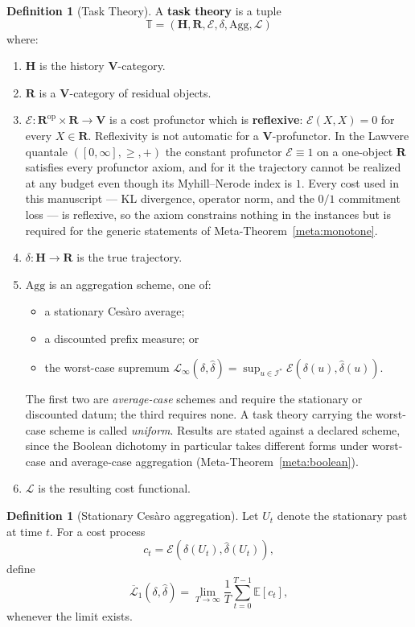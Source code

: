 \documentclass[12pt]{article}
\theoremstyle{definition}
\newtheorem{definition}[theorem]{Definition}
\begin{document}
\begin{definition}[Task Theory]
\label{def:task-theory}
A \textbf{task theory} is a tuple
\[
\mathbb T=(\mathbf H,\mathbf R,\mathcal E,\delta,\mathrm{Agg},\mathcal L)
\]
where:
\begin{enumerate}[nosep,label=(\arabic*)]
\item $\mathbf H$ is the history $\mathbf V$-category.
\item $\mathbf R$ is a $\mathbf V$-category of residual objects.
\item $\mathcal E:\mathbf R^{\mathrm{op}}\times\mathbf R\to\mathbf V$ is a
cost profunctor which is \textbf{reflexive}: $\mathcal E(X,X)=0$ for every
$X\in\mathbf R$.  Reflexivity is not automatic for a $\mathbf V$-profunctor.
In the Lawvere quantale $([0,\infty],\ge,+)$ the constant profunctor
$\mathcal E\equiv1$ on a one-object $\mathbf R$ satisfies every profunctor
axiom, and for it the trajectory cannot be realized at any budget even though
its Myhill--Nerode index is $1$.  Every cost used in this manuscript --- KL divergence,
operator norm, and the $0/1$ commitment loss --- is reflexive, so the axiom
constrains nothing in the instances but is required for the generic statements
of Meta-Theorem~\ref{meta:monotone}.
\item $\delta:\mathbf H\to\mathbf R$ is the true trajectory.
\item $\mathrm{Agg}$ is an aggregation scheme, one of:
\begin{itemize}[nosep]
\item a stationary Ces\`aro average;
\item a discounted prefix measure; or
\item the worst-case supremum
$\mathcal L_\infty(\delta,\widehat\delta)=\sup_{u\in\mathcal I^*}
\mathcal E(\delta(u),\widehat\delta(u))$.
\end{itemize}
The first two are \emph{average-case} schemes and require the stationary or
discounted datum; the third requires none.  A task theory carrying the
worst-case scheme is called \emph{uniform}.  Results are stated against a
declared scheme, since the Boolean dichotomy in particular takes different
forms under worst-case and average-case aggregation
(Meta-Theorem~\ref{meta:boolean}).
\item $\mathcal L$ is the resulting cost functional.
\end{enumerate}
\end{definition}

\begin{definition}[Stationary Ces\`aro aggregation]
\label{def:cesaro-agg}
Let $U_t$ denote the stationary past at time $t$.  For a cost process
\[
c_t=\mathcal E(\delta(U_t),\widehat\delta(U_t)),
\]
define
\[
\overline{\mathcal L}_1(\delta,\widehat\delta)
=
\lim_{T\to\infty}
\frac1T
\sum_{t=0}^{T-1}
\mathbb E[c_t],
\]
whenever the limit exists.
\end{definition}
\end{document}
